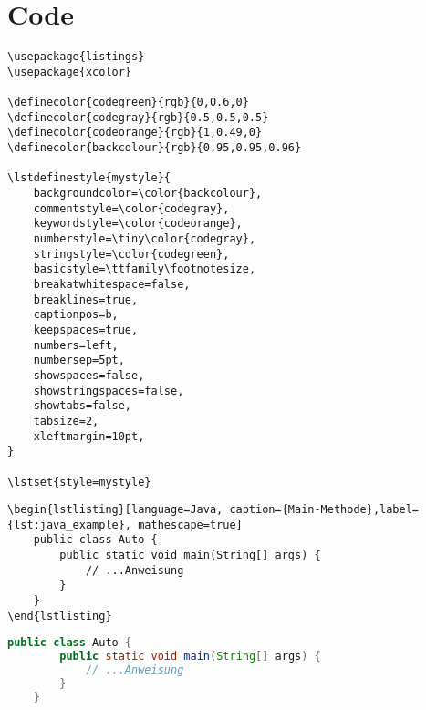 \section{Code}

\begin{verbatim}
\usepackage{listings}
\usepackage{xcolor}

\definecolor{codegreen}{rgb}{0,0.6,0}
\definecolor{codegray}{rgb}{0.5,0.5,0.5}
\definecolor{codeorange}{rgb}{1,0.49,0}
\definecolor{backcolour}{rgb}{0.95,0.95,0.96}

\lstdefinestyle{mystyle}{
    backgroundcolor=\color{backcolour},   
    commentstyle=\color{codegray},
    keywordstyle=\color{codeorange},
    numberstyle=\tiny\color{codegray},
    stringstyle=\color{codegreen},
    basicstyle=\ttfamily\footnotesize,
    breakatwhitespace=false,         
    breaklines=true,                 
    captionpos=b,                    
    keepspaces=true,                 
    numbers=left,                    
    numbersep=5pt,                  
    showspaces=false,                
    showstringspaces=false,
    showtabs=false,                  
    tabsize=2,
    xleftmargin=10pt,
}

\lstset{style=mystyle}
\end{verbatim}



\begin{verbatim}
\begin{lstlisting}[language=Java, caption={Main-Methode},label={lst:java_example}, mathescape=true]
    public class Auto {
        public static void main(String[] args) {
            // ...Anweisung
        }
    }
\end{lstlisting}
\end{verbatim}

\begin{lstlisting}[language=Java, caption={Main-Methode},label={lst:java_example}, mathescape=true]
    public class Auto {
        public static void main(String[] args) {
            // ...Anweisung
        }
    }
\end{lstlisting}
